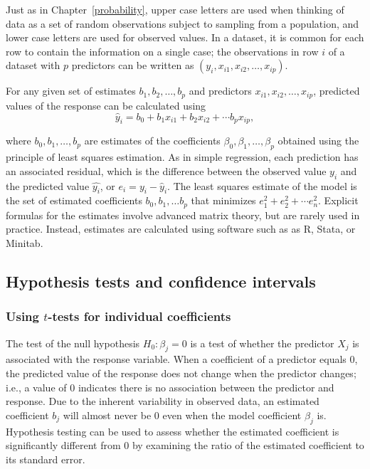 Just as in Chapter~\ref{probability}, upper case letters are used when thinking of data as a set of random observations subject to sampling from a population, and lower case letters are used for observed values. In a dataset, it is common for each row to contain the information on a single case; the observations in row $i$ of a dataset with $p$ predictors can be written as $(y_i, x_{i1}, x_{i2}, \ldots, x_{ip})$.

For any given set of estimates $b_1, b_2,\ldots,b_p$ and predictors $x_{i1},x_{i2},\ldots,x_{ip}$, predicted values of the response can be calculated using
\[
   \hat{y}_i = b_0 + b_1 x_{i1} + b_2 x_{i2} +\cdots b_p x_{ip},
\]

where $b_0, b_1, \dots, b_p$ are estimates of the coefficients $\beta_0, \beta_1, \dots, \beta_p$ obtained using the principle of least squares estimation. As in simple regression, each prediction has an associated residual, which is the difference between the observed value $y_i$ and the predicted value $\hat{y_i}$, or $e_i = y_i - \hat{y}_i$. The least squares estimate of the model is the set of estimated coefficients $b_0, b_1, \ldots b_p$ that minimizes $e_1^2 + e_2^2 + \cdots e_n^2$. Explicit formulas for the estimates involve advanced matrix theory, but are rarely used in practice.  Instead, estimates are calculated using software such as as \textsf{R}, Stata, or Minitab.

\subsection{Hypothesis tests and confidence intervals}

\subsubsection{Using $t$-tests for individual coefficients}

The test of the null hypothesis $H_0: \beta_j = 0$ is a test of whether the predictor $X_j$ is associated with the response variable. When a coefficient of a predictor equals 0, the predicted value of the response does not change when the predictor changes; i.e., a value of 0 indicates there is no association between the predictor and response. Due to the inherent variability in observed data, an estimated coefficient $b_j$ will almost never be 0 even when the model coefficient $\beta_j$ is. Hypothesis testing can be used to assess whether the estimated coefficient is significantly different from 0 by examining the ratio of the estimated coefficient to its standard error.


